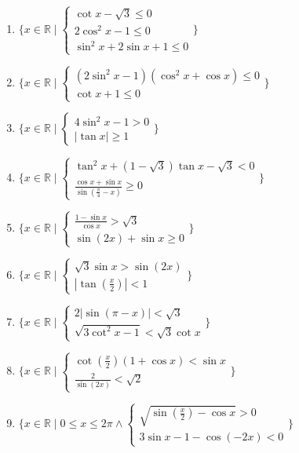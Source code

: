 \documentclass[11pt,a4paper]{article}
\begin{document}
\begin{enumerate}
\item $\displaystyle \{x \in \mathbb{R} \mid \begin{cases} \cot x - \sqrt{3} \le 0 \\ 2\cos^{2} x - 1 \le 0 \\ \sin^{2} x + 2\sin x + 1 \le 0 \end{cases}\}$
\item $\displaystyle \{x \in \mathbb{R} \mid \begin{cases} (2\sin^{2} x - 1)(\cos^{2} x + \cos x) \le 0 \\ \cot x + 1 \le 0 \end{cases}\}$
\item $\displaystyle \{x \in \mathbb{R} \mid \begin{cases} 4\sin^{2} x - 1 > 0 \\ \left|\tan x\right| \ge 1 \end{cases}\}$
\item $\displaystyle \{x \in \mathbb{R} \mid \begin{cases} \tan^{2} x + (1 - \sqrt{3})\tan x - \sqrt{3} < 0 \\ \frac{\cos x + \sin x}{\sin\left(\frac{\pi}{4} - x\right)} \ge 0 \end{cases}\}$
\item $\displaystyle \{x \in \mathbb{R} \mid \begin{cases} \frac{1 - \sin x}{\cos x} > \sqrt{3} \\ \sin\left(2x\right) + \sin x \ge 0 \end{cases}\}$
\item $\displaystyle \{x \in \mathbb{R} \mid \begin{cases} \sqrt{3}\sin x > \sin\left(2x\right) \\ \left|\tan\left(\frac{x}{2}\right)\right| < 1 \end{cases}\}$
\item $\displaystyle \{x \in \mathbb{R} \mid \begin{cases} 2\left|\sin\left(\pi - x\right)\right| < \sqrt{3} \\ \sqrt{3\cot^{2} x - 1} < \sqrt{3}\cot x \end{cases}\}$
\item $\displaystyle \{x \in \mathbb{R} \mid \begin{cases} \cot\left(\frac{x}{2}\right)(1 + \cos x) < \sin x \\ \frac{2}{\sin\left(2x\right)} < \sqrt{2} \end{cases}\}$
\item $\displaystyle \{x \in \mathbb{R} \mid 0 \le x \le 2\pi \land \begin{cases} \sqrt{\sin\left(\frac{x}{2}\right) - \cos x} > 0 \\ 3\sin x - 1 - \cos\left(-2x\right) < 0 \end{cases}\}$

\end{enumerate}
\end{document}
